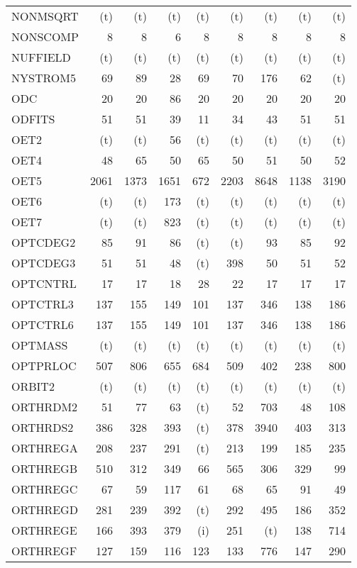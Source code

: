\documentclass[11pt,twoside]{article}
\begin{document}
{\begin{longtable}[c]{|l|r|r|r|r|r|r|r|r|}
 NONMSQRT & (t) & (t) & (t) & (t) & (t) & (t) & (t) & (t) \\
 NONSCOMP & 8 & 8 & 6 & 8 & 8 & 8 & 8 & 8 \\
 NUFFIELD & (t) & (t) & (t) & (t) & (t) & (t) & (t) & (t) \\
 NYSTROM5 & 69 & 89 & 28 & 69 & 70 & 176 & 62 & (t) \\
 ODC & 20 & 20 & 86 & 20 & 20 & 20 & 20 & 20 \\
 ODFITS & 51 & 51 & 39 & 11 & 34 & 43 & 51 & 51 \\
 OET2 & (t) & (t) & 56 & (t) & (t) & (t) & (t) & (t) \\
 OET4 & 48 & 65 & 50 & 65 & 50 & 51 & 50 & 52 \\
 OET5 & 2061 & 1373 & 1651 & 672 & 2203 & 8648 & 1138 & 3190 \\
 OET6 & (t) & (t) & 173 & (t) & (t) & (t) & (t) & (t) \\
 OET7 & (t) & (t) & 823 & (t) & (t) & (t) & (t) & (t) \\
 OPTCDEG2 & 85 & 91 & 86 & (t) & (t) & 93 & 85 & 92 \\
 OPTCDEG3 & 51 & 51 & 48 & (t) & 398 & 50 & 51 & 52 \\
 OPTCNTRL & 17 & 17 & 18 & 28 & 22 & 17 & 17 & 17 \\
 OPTCTRL3 & 137 & 155 & 149 & 101 & 137 & 346 & 138 & 186 \\
 OPTCTRL6 & 137 & 155 & 149 & 101 & 137 & 346 & 138 & 186 \\
 OPTMASS & (t) & (t) & (t) & (t) & (t) & (t) & (t) & (t) \\
 OPTPRLOC & 507 & 806 & 655 & 684 & 509 & 402 & 238 & 800 \\
 ORBIT2 & (t) & (t) & (t) & (t) & (t) & (t) & (t) & (t) \\
 ORTHRDM2 & 51 & 77 & 63 & (t) & 52 & 703 & 48 & 108 \\
 ORTHRDS2 & 386 & 328 & 393 & (t) & 378 & 3940 & 403 & 313 \\
 ORTHREGA & 208 & 237 & 291 & (t) & 213 & 199 & 185 & 235 \\
 ORTHREGB & 510 & 312 & 349 & 66 & 565 & 306 & 329 & 99 \\
 ORTHREGC & 67 & 59 & 117 & 61 & 68 & 65 & 91 & 49 \\
 ORTHREGD & 281 & 239 & 392 & (t) & 292 & 495 & 186 & 352 \\
 ORTHREGE & 166 & 393 & 379 & (i) & 251 & (t) & 138 & 714 \\
 ORTHREGF & 127 & 159 & 116 & 123 & 133 & 776 & 147 & 290 \\

\end{longtable}}
\end{document}
